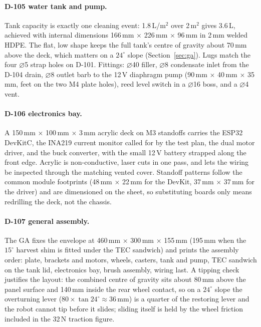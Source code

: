 \documentclass[11pt,a4paper]{article}
\begin{document}
\paragraph{D-105 water tank and pump.}
Tank capacity is exactly one cleaning event: 1.8\,L/m$^2$ over 2\,m$^2$
gives 3.6\,L, achieved with internal dimensions 166\,mm $\times$ 226\,mm
$\times$ 96\,mm in 2\,mm welded HDPE. The flat, low shape keeps the full
tank's centre of gravity about 70\,mm above the deck, which matters on a
$24^\circ$ slope (Section~\ref{sec:ga}). Lugs match the four $\varnothing$5
strap holes on D-101. Fittings: $\varnothing$40 filler, $\varnothing$8
condensate inlet from the D-104 drain, $\varnothing$8 outlet barb to the
12\,V diaphragm pump (90\,mm $\times$ 40\,mm $\times$ 35\,mm, feet on the
two M4 plate holes), reed level switch in a $\varnothing$16 boss, and a
$\varnothing$4 vent.

\paragraph{D-106 electronics bay.}
A 150\,mm $\times$ 100\,mm $\times$ 3\,mm acrylic deck on M3 standoffs
carries the ESP32 DevKitC, the INA219 current monitor called for by the test
plan, the dual motor driver, and the buck converter, with the small 12\,V
battery strapped along the front edge. Acrylic is non-conductive, laser cuts
in one pass, and lets the wiring be inspected through the matching vented
cover. Standoff patterns follow the common module footprints (48\,mm
$\times$ 22\,mm for the DevKit, 37\,mm $\times$ 37\,mm for the driver) and
are dimensioned on the sheet, so substituting boards only means redrilling
the deck, not the chassis.

\paragraph{D-107 general assembly.}
The GA fixes the envelope at 460\,mm $\times$ 300\,mm $\times$ 155\,mm
(195\,mm when the $15^\circ$ harvest shim is fitted under the TEC sandwich)
and prints the assembly order: plate, brackets and motors, wheels, casters,
tank and pump, TEC sandwich on the tank lid, electronics bay, brush
assembly, wiring last. A tipping check justifies the layout: the combined
centre of gravity sits about 80\,mm above the panel surface and 140\,mm
inside the rear wheel contact, so on a $24^\circ$ slope the overturning
lever ($80 \times \tan 24^\circ \approx 36$\,mm) is a quarter of the
restoring lever and the robot cannot tip before it slides; sliding itself is
held by the wheel friction included in the 32\,N traction figure.
\end{document}
